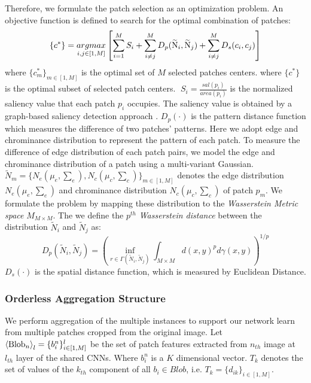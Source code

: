 \documentclass[10pt,twocolumn,letterpaper]{article}
\begin{document}
Therefore, we formulate the patch selection as an optimization problem.  An objective function is defined to search for the optimal combination of patches:
\begin{equation}
\{ {c^ * }\}  = \mathop {argmax}\limits_{i,j \in [1,M]} \left[ {\sum\limits_{i = 1}^M {{S_i}}  + \sum\limits_{i \ne j}^M {{D_p}({{\widetilde {\rm N}}_i},{{\widetilde {\rm N}}_j}) + \sum\limits_{i \ne j}^M {{D_s}({c_i},{c_j})} } } \right]
\end{equation}
where ${\{ c_m^ * \} _{m \in [1,M]}}$ is the optimal set of $M$ selected patches centers.
where $\{ {c^ * }\} $ is the optimal subset of selected patch centers. $\;{S_i} = \frac{{sal({p_i})}}{{area({p_i})}}$ is the normalized saliency value that 
each patch $p_i$ occupies. The saliency value is obtained by a graph-based saliency detection approach \cite{C.Yang:2013:CVPR:graph_based_saliency}.
${D_p}( \cdot )$ is the pattern distance function which 
measures the difference of two patches' patterns. 
Here we adopt edge and chrominance distribution to represent the pattern of each patch. To measure the difference of edge distribution of each patch pairs, we model the edge and chrominance distribution of a patch using a multi-variant Gaussian. ${{\tilde N}_m} = {\{ {N_e}({\mu _e},{\sum _e}),{N_c}({\mu _c},{\sum _c})\} _{m \in [1,M]}}$ denotes the edge distribution ${N_e}({\mu _e},{\sum _e})$ and chrominance distribution ${N_c}({\mu _c},{\sum _c})$ of patch $p_m$. We formulate the problem by mapping these distribution to the \textit{Wasserstein Metric space} $M_{M\times M}$. The we define the $p^{th}$ \textit{Wasserstein distance} between the distribution  ${{\tilde N}_i}$ and ${{\tilde N}_j}$ as:
\begin{equation}
{D_p}({{\tilde N}_i},{{\tilde N}_j}) = {\left( {\mathop {\inf }\limits_{r \in \Gamma ({{\tilde N}_i},{{\tilde N}_j})} \int_{M \times M} {d{{(x,y)}^p}d\gamma (x,y)} } \right)^{1/p}}
\end{equation}
${D_s}( \cdot )$ is the spatial distance function, which is measured by Euclidean Distance.

\subsubsection{Orderless Aggregation Structure}
We perform aggregation of the multiple instances to support our network learn from multiple patches cropped from the original image.
Let ${\left\langle {{\rm{Blo}}{{\rm{b}}_n}} \right\rangle _{l}} = \{ b_i^n\} _{i \in [1,M]}^{l}$ be the set of patch features extracted from $n_{th}$ image 
at $l_{th}$ layer of the shared CNNs. Where $b_i^n$ is a $K$ dimensional vector.
$T_k$ denotes the set of values of the $k_{th}$ component of all ${b_i} \in Blob$, i.e. ${T_k} = {\{ {d_{ik}}\} _{i \in [1,M]}}$.
\end{document}
